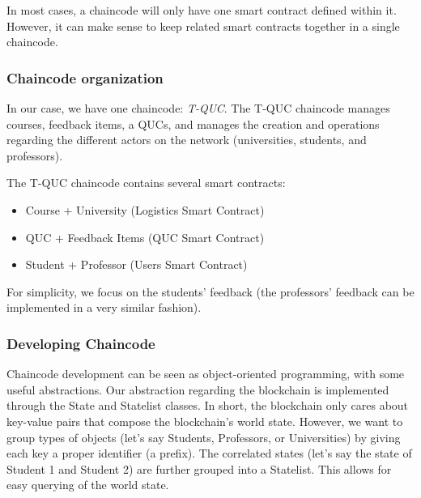 \documentclass[12pt,a4paper]{article}
\theoremstyle{definition}
\begin{document}


    In most cases, a chaincode will only have one smart contract defined within it. However, it can make sense to keep related smart contracts together in a single chaincode.

    \subsubsection{Chaincode organization}
    In our case, we have one chaincode: \emph{T-QUC}. The T-QUC chaincode manages courses, feedback items, a QUCs, and manages the creation and operations regarding the different actors on the network (universities, students, and professors).

    The T-QUC chaincode contains several smart contracts:
    \begin{itemize}
        \item Course + University (Logistics Smart Contract)
        \item QUC + Feedback Items (QUC Smart Contract)
        \item Student + Professor (Users Smart Contract)

    \end{itemize}

    For simplicity, we focus on the students' feedback (the professors' feedback can be implemented in a very similar fashion).
%

    \subsubsection{Developing Chaincode}

    Chaincode development can be seen as object-oriented programming, with some useful abstractions. Our abstraction regarding the blockchain is implemented through the State and Statelist classes. In short, the blockchain only cares about key-value pairs that compose the blockchain's world state. However, we want to group types of objects (let's say Students, Professors, or Universities) by giving each key a proper identifier (a prefix). The correlated states (let's say the state of Student 1 and Student 2) are further grouped into a Statelist. This allows for easy querying of the world state.
\end{document}
